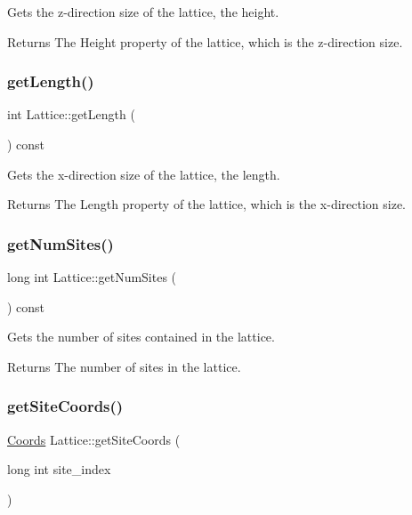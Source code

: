 Gets the z-\/direction size of the lattice, the height. 

\begin{DoxyReturn}{Returns}
The Height property of the lattice, which is the z-\/direction size. 
\end{DoxyReturn}
\mbox{\label{class_lattice_a4b43b67a36fcd3dfe62c9eeaffa561d2}} 
\subsubsection{\texorpdfstring{get\+Length()}{getLength()}}
{\footnotesize\ttfamily int Lattice\+::get\+Length (\begin{DoxyParamCaption}{ }\end{DoxyParamCaption}) const}



Gets the x-\/direction size of the lattice, the length. 

\begin{DoxyReturn}{Returns}
The Length property of the lattice, which is the x-\/direction size. 
\end{DoxyReturn}
\mbox{\label{class_lattice_a4be17e9123f7737387991a9d1a8b87b3}} 
\subsubsection{\texorpdfstring{get\+Num\+Sites()}{getNumSites()}}
{\footnotesize\ttfamily long int Lattice\+::get\+Num\+Sites (\begin{DoxyParamCaption}{ }\end{DoxyParamCaption}) const}



Gets the number of sites contained in the lattice. 

\begin{DoxyReturn}{Returns}
The number of sites in the lattice. 
\end{DoxyReturn}
\mbox{\label{class_lattice_a74a170b841ad1b74dad43519d37e9eaf}} 
\subsubsection{\texorpdfstring{get\+Site\+Coords()}{getSiteCoords()}}
{\footnotesize\ttfamily \hyperlink{struct_coords}{Coords} Lattice\+::get\+Site\+Coords (\begin{DoxyParamCaption}\item[{long int}]{site\+\_\+index }\end{DoxyParamCaption})}



